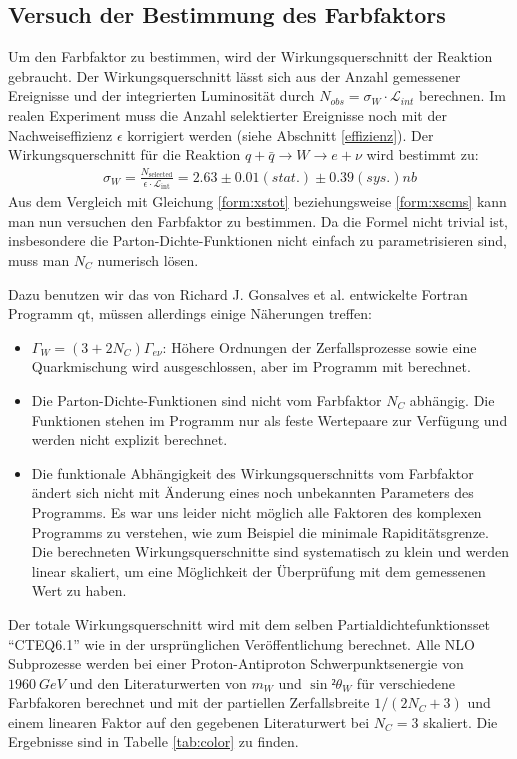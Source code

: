 \documentclass[a4paper,12pt]{article}
\begin{document}
\subsection{Versuch der Bestimmung des Farbfaktors}
Um den Farbfaktor zu bestimmen, wird der Wirkungsquerschnitt der Reaktion gebraucht.
Der Wirkungsquerschnitt lässt sich aus der Anzahl gemessener Ereignisse und der
integrierten Luminosität durch $N_{obs}=\sigma_W \cdot \mathcal{L}_{int}$ berechnen. Im realen Experiment
muss die Anzahl selektierter Ereignisse noch mit der Nachweiseffizienz $\epsilon$
korrigiert werden (siehe Abschnitt \ref{effizienz}).
Der Wirkungsquerschnitt für die Reaktion $q+\bar{q}\rightarrow W \rightarrow e+ \nu$ wird bestimmt zu:
\begin{align*}
	\sigma_W = \frac{N_\text{selected}}{\epsilon \cdot \mathcal{L}_\text{int}} =  2.63 ± 0.01 (stat.) ± 0.39(sys.) \si{nb}
\end{align*}
Aus dem Vergleich mit Gleichung \ref{form:xstot} beziehungsweise \ref{form:xscms} kann man nun
versuchen den Farbfaktor zu bestimmen. Da die Formel nicht trivial ist, insbesondere die
Parton-Dichte-Funktionen nicht einfach zu parametrisieren sind, muss man $N_C$ numerisch lösen.

Dazu benutzen wir das von Richard J. Gonsalves et al. entwickelte Fortran Programm qt\cite{qtsite},
müssen allerdings einige Näherungen treffen:
\begin{itemize}
	\item $Γ_W = (3+2N_C)Γ_{eν}$: Höhere Ordnungen der Zerfallsprozesse sowie eine Quarkmischung
		wird ausgeschlossen, aber im Programm mit berechnet.
	\item Die Parton-Dichte-Funktionen sind nicht vom Farbfaktor $N_C$ abhängig. Die Funktionen stehen
		im Programm nur als feste Wertepaare zur Verfügung und werden nicht explizit berechnet.
	\item Die funktionale Abhängigkeit des Wirkungsquerschnitts vom Farbfaktor ändert sich nicht mit
		Änderung eines noch unbekannten Parameters des Programms. Es
		war uns leider nicht möglich alle Faktoren des komplexen Programms zu verstehen, wie zum
		Beispiel die minimale Rapiditätsgrenze. Die berechneten Wirkungsquerschnitte sind
		systematisch zu klein und werden linear skaliert, um eine Möglichkeit der Überprüfung mit dem gemessenen
		Wert zu haben.
\end{itemize}

Der totale Wirkungsquerschnitt wird mit dem selben Partialdichtefunktionsset "`CTEQ6.1"' wie in der ursprünglichen
Veröffentlichung\cite{Abachi:1996ey} berechnet. Alle NLO Subprozesse werden bei einer
Proton-Antiproton Schwerpunktsenergie von $\SI{1960}{GeV}$ und den Literaturwerten von $m_W$ und
$\sin²θ_W$ für verschiedene Farbfakoren berechnet
und mit der partiellen Zerfallsbreite $1/(2N_C +3)$ und einem linearen Faktor auf den gegebenen
Literaturwert bei $N_C = 3$ skaliert.
Die Ergebnisse sind in Tabelle \ref{tab:color} zu finden.
\end{document}
